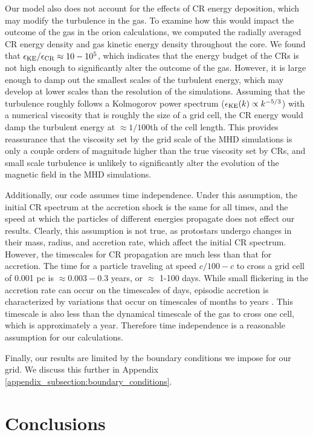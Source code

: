 \documentclass[twocolumn]{aastex63}
\begin{document}
Our model also does not account for the effects of CR energy deposition, which may modify the turbulence in the gas. To examine how this would impact the outcome of the gas in the {\sc orion} calculations, we computed the radially averaged CR energy density and gas kinetic energy density throughout the core. We found that $\epsilon_{\rm KE}/\epsilon_{\rm CR} \approx 10-10^{5}$, which indicates that the energy budget of the CRs is not high enough to significantly alter the outcome of the gas. However, it is large enough to damp out the smallest scales of the turbulent energy, which may develop at lower scales than the resolution of the \cite{offner_2017_impact} simulations. Assuming that the turbulence roughly follows a Kolmogorov power spectrum ($ \epsilon_{\rm KE}(k) \propto k^{-5/3}$) with a numerical viscosity that is roughly the size of a grid cell, the CR energy would damp the turbulent energy at $\approx 1/100$th of the cell length. This provides reassurance that the viscosity set by the grid scale of the MHD simulations is only a couple orders of magnitude higher than the true viscosity set by CRs, and small scale turbulence is unlikely to significantly alter the evolution of the magnetic field in the MHD simulations.

Additionally, our code assumes time independence. Under this assumption, the initial CR spectrum at the accretion shock is the same for all times, and the speed at which the particles of different energies propagate does not effect our results. Clearly, this assumption is not true, as protostars undergo changes in their mass, radius, and accretion rate, which affect the initial CR spectrum. However, the timescales for CR propagation are much less than that for accretion. The time for a particle traveling at speed $c/100-c$ to cross a grid cell of 0.001 pc is $\approx 0.003-0.3$ years, or  $\approx$ 1-100 days. While small flickering in the accretion rate can occur on the timescales of days, episodic accretion is characterized by variations that occur on timescales of months to years \citep{audard_2014_ppvi}. This timescale is also less than the dynamical timescale of the gas to cross one cell, which is approximately a year. Therefore time independence is a reasonable assumption for our calculations.

Finally, our results are limited by the boundary conditions we impose for our grid. We discuss this further in Appendix \ref{appendix_subsection:boundary_conditions}. 

\section{Conclusions}
\end{document}
